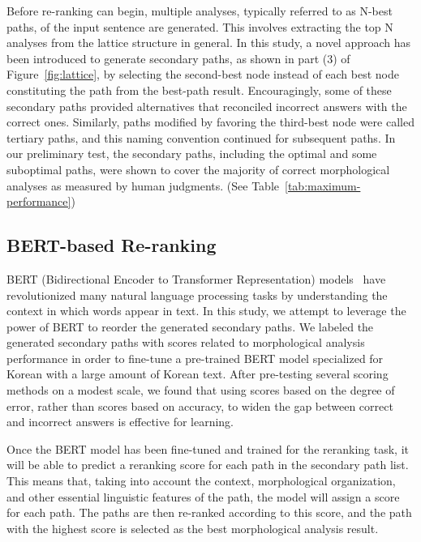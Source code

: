\documentclass[AMS,STIX2COL]{WileyNJD-v2}
\begin{document}
    Before re-ranking can begin, multiple analyses, typically referred to as N-best paths, of the input sentence are generated.
    This involves extracting the top N analyses from the lattice structure in general.
    In this study, a novel approach has been introduced to generate secondary paths, as shown in part (3) of Figure~\ref{fig:lattice}, by selecting the second-best node instead of each best node constituting the path from the best-path result.
    Encouragingly, some of these secondary paths provided alternatives that reconciled incorrect answers with the correct ones.
    Similarly, paths modified by favoring the third-best node were called tertiary paths, and this naming convention continued for subsequent paths.
    In our preliminary test, the secondary paths, including the optimal and some suboptimal paths, were shown to cover the majority of correct morphological analyses as measured by human judgments. (See Table~\ref{tab:maximum-performance})

    \subsection{BERT-based Re-ranking}\label{subsec4.3}

    BERT (Bidirectional Encoder to Transformer Representation) models~\cite{Devlin2019} have revolutionized many natural language processing tasks by understanding the context in which words appear in text. In this study, we attempt to leverage the power of BERT to reorder the generated secondary paths. We labeled the generated secondary paths with scores related to morphological analysis performance in order to fine-tune a pre-trained BERT model specialized for Korean with a large amount of Korean text. After pre-testing several scoring methods on a modest scale, we found that using scores based on the degree of error, rather than scores based on accuracy, to widen the gap between correct and incorrect answers is effective for learning.

    Once the BERT model has been fine-tuned and trained for the reranking task, it will be able to predict a reranking score for each path in the secondary path list. This means that, taking into account the context, morphological organization, and other essential linguistic features of the path, the model will assign a score for each path. The paths are then re-ranked according to this score, and the path with the highest score is selected as the best morphological analysis result.
\end{document}

